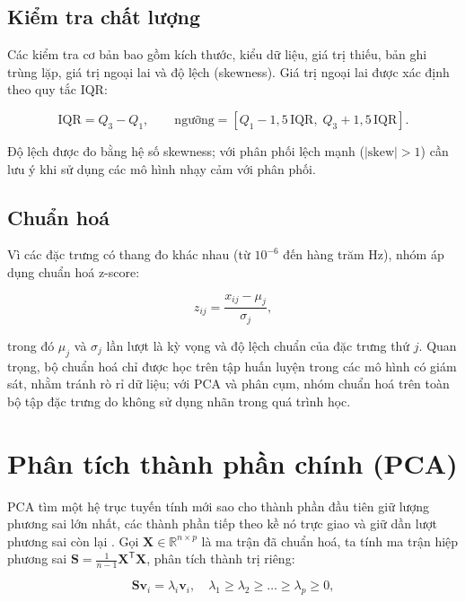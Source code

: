 \subsection{Kiểm tra chất lượng}
Các kiểm tra cơ bản bao gồm kích thước, kiểu dữ liệu, giá trị thiếu, bản ghi trùng lặp, giá
trị ngoại lai và độ lệch (skewness). Giá trị ngoại lai được xác định theo quy tắc IQR:

\begin{equation}
\text{IQR} = Q_3 - Q_1, \qquad
\text{ngưỡng} = [Q_1 - 1{,}5\,\text{IQR},\; Q_3 + 1{,}5\,\text{IQR}].
\label{eq:iqr}
\end{equation}

Độ lệch được đo bằng hệ số skewness; với phân phối lệch mạnh ($|\text{skew}| > 1$) cần lưu ý
khi sử dụng các mô hình nhạy cảm với phân phối.

\subsection{Chuẩn hoá}
Vì các đặc trưng có thang đo khác nhau (từ $10^{-6}$ đến hàng trăm Hz), nhóm áp dụng chuẩn
hoá z-score:

\begin{equation}
z_{ij} = \frac{x_{ij} - \mu_j}{\sigma_j},
\label{eq:zscore}
\end{equation}

trong đó $\mu_j$ và $\sigma_j$ lần lượt là kỳ vọng và độ lệch chuẩn của đặc trưng thứ $j$.
Quan trọng, bộ chuẩn hoá chỉ được học trên tập huấn luyện trong các mô hình có giám sát, nhằm
tránh rò rỉ dữ liệu; với PCA và phân cụm, nhóm chuẩn hoá trên toàn bộ tập đặc trưng do không
sử dụng nhãn trong quá trình học.

\section{Phân tích thành phần chính (PCA)}

PCA tìm một hệ trục tuyến tính mới sao cho thành phần đầu tiên giữ lượng phương sai lớn
nhất, các thành phần tiếp theo kề nó trực giao và giữ dần lượt phương sai còn lại
\cite{jolliffe2002}. Gọi $\mathbf{X} \in \mathbb{R}^{n\times p}$ là ma trận đã chuẩn hoá, ta tính
ma trận hiệp phương sai $\mathbf{S} = \frac{1}{n-1}\mathbf{X}^{\mathsf T}\mathbf{X}$, phân tích
thành trị riêng:

\begin{equation}
\mathbf{S}\mathbf{v}_i = \lambda_i \mathbf{v}_i, \quad
\lambda_1 \ge \lambda_2 \ge \dots \ge \lambda_p \ge 0,
\label{eq:eigen}
\end{equation}

